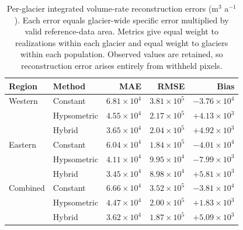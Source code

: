 \begin{table}[!htbp]
\centering\small
\setlength{\tabcolsep}{5pt}
\caption{Per-glacier integrated volume-rate reconstruction errors (m$^3$ a$^{-1}$). Each error equals glacier-wide specific error multiplied by valid reference-data area. Metrics give equal weight to realizations within each glacier and equal weight to glaciers within each population. Observed values are retained, so reconstruction error arises entirely from withheld pixels.}
\label{tab:volume}
\begin{tabular}{llrrr}
\toprule
Region & Method & MAE & RMSE & Bias \\
\midrule
Western & Constant & $6.81\times10^{4}$ & $3.81\times10^{5}$ & $-3.76\times10^{4}$ \\
 & Hypsometric & $4.55\times10^{4}$ & $2.17\times10^{5}$ & {\boldmath$+4.13\times10^{3}$} \\
 & Hybrid & {\boldmath$3.65\times10^{4}$} & {\boldmath$2.04\times10^{5}$} & $+4.92\times10^{3}$ \\
\midrule
Eastern & Constant & $6.04\times10^{4}$ & $1.84\times10^{5}$ & $-4.01\times10^{4}$ \\
 & Hypsometric & $4.11\times10^{4}$ & $9.95\times10^{4}$ & $-7.99\times10^{3}$ \\
 & Hybrid & {\boldmath$3.45\times10^{4}$} & {\boldmath$8.98\times10^{4}$} & {\boldmath$+5.81\times10^{3}$} \\
\midrule
Combined & Constant & $6.66\times10^{4}$ & $3.52\times10^{5}$ & $-3.81\times10^{4}$ \\
 & Hypsometric & $4.47\times10^{4}$ & $2.00\times10^{5}$ & {\boldmath$+1.83\times10^{3}$} \\
 & Hybrid & {\boldmath$3.62\times10^{4}$} & {\boldmath$1.87\times10^{5}$} & $+5.09\times10^{3}$ \\
\bottomrule
\end{tabular}
\end{table}
